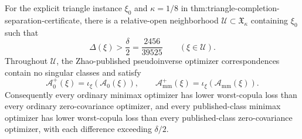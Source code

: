 For the explicit triangle instance \(\xi_0\) and \(\kappa=1/8\) in thm:triangle-completion-separation-certificate, there is a relative-open neighborhood \(\mathcal U\subset\mathfrak X_\kappa\) containing \(\xi_0\) such that
\[
\Delta(\xi)>\frac{\delta}{2}=\frac{2456}{39525}
\qquad(\xi\in\mathcal U).
\]
Throughout \(\mathcal U\), the Zhao-published pseudoinverse optimizer correspondences contain no singular classes and satisfy
\[
\mathcal A_0^+(\xi)=\iota_\xi(\mathcal A_0(\xi)),
\qquad
\mathcal A_{\mathrm{mm}}^+(\xi)=\iota_\xi(\mathcal A_{\mathrm{mm}}(\xi)).
\]
Consequently every ordinary minimax optimizer has lower worst-copula loss than every ordinary zero-covariance optimizer, and every published-class minimax optimizer has lower worst-copula loss than every published-class zero-covariance optimizer, with each difference exceeding \(\delta/2\).